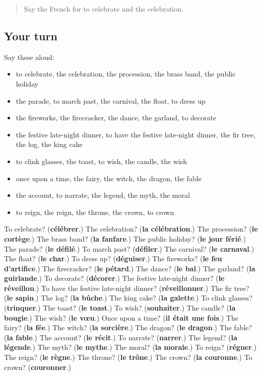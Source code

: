 \label{lesson:FR-R323-revision-316-323}



\begin{quote}
Say the French for to celebrate and the celebration.
\end{quote}

\subsection*{Your turn}
Say these aloud:

\begin{itemize}
\raggedright
  \item to celebrate, the celebration, the procession, the brass band, the public holiday
  \item the parade, to march past, the carnival, the float, to dress up
  \item the fireworks, the firecracker, the dance, the garland, to decorate
  \item the festive late-night dinner, to have the festive late-night dinner, the fir tree, the log, the king cake
  \item to clink glasses, the toast, to wish, the candle, the wish
  \item once upon a time, the fairy, the witch, the dragon, the fable
  \item the account, to narrate, the legend, the myth, the moral
  \item to reign, the reign, the throne, the crown, to crown
\end{itemize}

\begin{tcolorbox}[breakable,colback=teal!4,colframe=teal!35!black,title={Before you move on}]
To celebrate? (\textbf{célébrer}.) The celebration? (\textbf{la célébration}.) The procession? (\textbf{le cortège}.) The brass band? (\textbf{la fanfare}.) The public holiday? (\textbf{le jour férié}.) The parade? (\textbf{le défilé}.) To march past? (\textbf{défiler}.) The carnival? (\textbf{le carnaval}.) The float? (\textbf{le char}.) To dress up? (\textbf{déguiser}.) The fireworks? (\textbf{le feu d'artifice}.) The firecracker? (\textbf{le pétard}.) The dance? (\textbf{le bal}.) The garland? (\textbf{la guirlande}.) To decorate? (\textbf{décorer}.) The festive late-night dinner? (\textbf{le réveillon}.) To have the festive late-night dinner? (\textbf{réveillonner}.) The fir tree? (\textbf{le sapin}.) The log? (\textbf{la bûche}.) The king cake? (\textbf{la galette}.) To clink glasses? (\textbf{trinquer}.) The toast? (\textbf{le toast}.) To wish? (\textbf{souhaiter}.) The candle? (\textbf{la bougie}.) The wish? (\textbf{le vœu}.) Once upon a time? (\textbf{il était une fois}.) The fairy? (\textbf{la fée}.) The witch? (\textbf{la sorcière}.) The dragon? (\textbf{le dragon}.) The fable? (\textbf{la fable}.) The account? (\textbf{le récit}.) To narrate? (\textbf{narrer}.) The legend? (\textbf{la légende}.) The myth? (\textbf{le mythe}.) The moral? (\textbf{la morale}.) To reign? (\textbf{régner}.) The reign? (\textbf{le règne}.) The throne? (\textbf{le trône}.) The crown? (\textbf{la couronne}.) To crown? (\textbf{couronner}.)
\end{tcolorbox}
